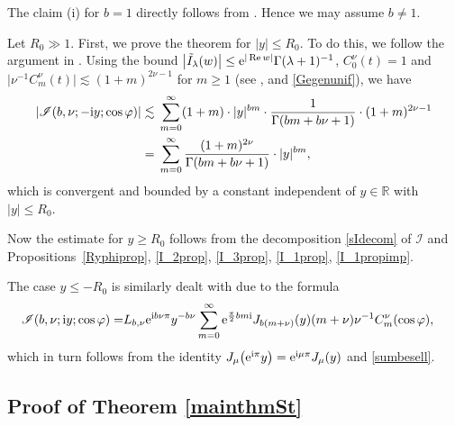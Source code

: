 \documentclass[10pt,a4paper]{amsart}
\numberwithin{equation}{section}
\def\R{\mathbb{R}}%
\DeclareMathOperator{\re}{Re}%
\def\f{\varphi}
\def\l{\lambda}
\def\m{\mu}
\def\n{\nu}
\newcommand{\sI}{\mathscr{I}}
\begin{document}
The claim (i) for $b=1$ directly follows from \cite[equation~(4.45)]{BKO}. Hence we may assume $b\neq 1$.





Let $R_0\gg 1$. First, we prove the theorem for $|y|\leq R_0$. To do this, we follow the argument in \cite[Lemma 4.17]{BKO}.
Using the bound $\big|\tilde{I}_{\l}(w)\big|\leq {\rm e}^{|\re w|}\Gamma(\l+1)^{-1}$, $C_0^{\n}(t)=1$ and $\big|\n^{-1}C_{m}^{\n}(t)\big|\lesssim (1+m)^{2\n-1}$ for $m\geq 1$ (see \cite[equation~(4.16)]{BKO}, \cite[Fact 4.8]{BKO} and \eqref{Gegenunif}), we have
\begin{align*}
|\sI(b,\nu;-{\rm i}y;\cos\f)|\lesssim{}& \sum_{m=0}^{\infty}(1+m)\cdot |y|^{bm}\cdot \frac{1}{\Gamma(bm+b\n+1)}\cdot (1+m)^{2\n-1}\\
={}&\sum_{m=0}^{\infty}\frac{(1+m)^{2\n}}{\Gamma(bm+b\n+1)}\cdot |y|^{bm},
\end{align*}
which is convergent and bounded by a constant independent of $y\in \R$ with $|y|\leq R_0$.




Now the estimate for $y\geq R_0$ follows from the decomposition \eqref{sIdecom} of $\sI$ and Propositions~\ref{Ryphiprop}, \ref{I_2prop}, \ref{I_3prop}, \ref{I_1prop}, \ref{I_1propimp}.


The case $y\leq -R_0$ is similarly dealt with due to the formula
\begin{align*}
\sI(b,\nu;{\rm i}y;\cos\f)=&L_{b,\n}{\rm e}^{{\rm i}b\n\pi}y^{-b\n}\sum_{m=0}^{\infty}{\rm e}^{\frac{\pi}{2}bm{\rm i}}J_{b(m+\n)}(y)(m+\nu)\n^{-1}C^{\nu}_m(\cos\f),
\end{align*}
which in turn follows from the identity $J_{\m}\bigl({\rm e}^{{\rm i}\pi}y\bigr)={\rm e}^{{\rm i}\m\pi}J_{\m}(y)$ and \eqref{sumbesell}.





















\subsection[Proof of Theorem 1.1]{Proof of Theorem \ref{mainthmSt}}\label{subsec:Stpf}
\end{document}
